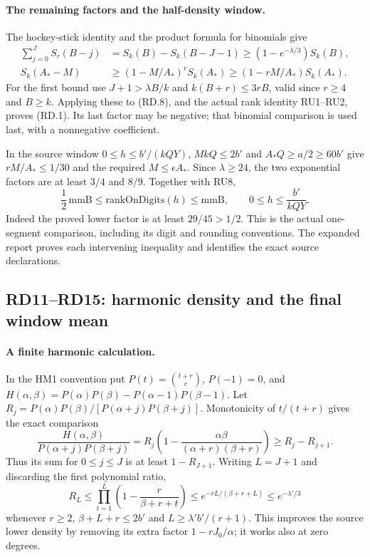 \paragraph{The remaining factors and the half-density window.}
The hockey-stick identity and the product formula for binomials give
\[
\begin{aligned}
 \sum_{j=0}^{J}S_r(B-j)&=S_k(B)-S_k(B-J-1)
                    \ge(1-e^{-\lambda/3})S_k(B),\\
 S_k(A_*-M)&\ge(1-M/A_*)^rS_k(A_*)
                    \ge(1-rM/A_*)S_k(A_*).
\end{aligned}
\]
For the first bound use $J+1>\lambda B/k$ and
$k(B+r)\le3rB$, valid since $r\ge4$ and $B\ge k$.
Applying these to (RD.8), and the actual rank identity RU1--RU2,
proves (RD.1). Its last factor may be negative; that binomial comparison
is used last, with a nonnegative coefficient.

In the source window $0\le h\le b'/(kQY)$,
$MkQ\le2b'$ and $A_*Q\ge a/2\ge60b'$ give
$rM/A_*\le1/30$ and the required $M\le\epsilon A_*$.
Since $\lambda\ge24$, the two exponential factors are at least
$3/4$ and $8/9$. Together with RU8,
\[
       \frac12\,\mathrm{mmB}
       \le\mathrm{rankOnDigits}(h)\le\mathrm{mmB},
       \qquad 0\le h\le\frac{b'}{kQY}.
 \tag{RD.9}
\]
Indeed the proved lower factor is at least $29/45>1/2$.
This is the actual one-segment comparison, including its digit and
rounding conventions. The expanded report proves each intervening
inequality and identifies the exact source declarations.

\subsection{RD11--RD15: harmonic density and the final window mean}
\label{sec:rank-density-mean}


\paragraph{A finite harmonic calculation.}
In the HM1 convention put $P(t)=\binom{t+r}{r}$, $P(-1)=0$, and
$H(\alpha,\beta)=P(\alpha)P(\beta)-P(\alpha-1)P(\beta-1)$.
Let $R_j=P(\alpha)P(\beta)/[P(\alpha+j)P(\beta+j)]$.
Monotonicity of $t/(t+r)$ gives the exact comparison
\[
 \frac{H(\alpha,\beta)}{P(\alpha+j)P(\beta+j)}
 =R_j\left(1-\frac{\alpha\beta}{(\alpha+r)(\beta+r)}\right)
 \ge R_j-R_{j+1}.
 \tag{RD.10}
\]
Thus its sum for $0\le j\le J$ is at least $1-R_{J+1}$.
Writing $L=J+1$ and discarding the first polynomial ratio,
\[
 R_L\le\prod_{t=1}^{L}\left(1-\frac r{\beta+r+t}\right)
 \le e^{-rL/(\beta+r+L)}\le e^{-\lambda'/3}
 \tag{RD.11}
\]
whenever $r\ge2$, $\beta+L+r\le2b'$ and
$L\ge\lambda'b'/(r+1)$. This improves the source lower density by
removing its extra factor $1-rJ_0/\alpha$; it works also at zero degrees.

